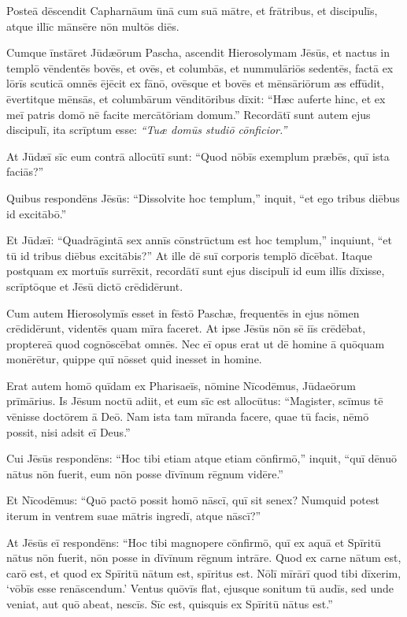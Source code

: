 \Versus Posteā dēscendit Capharnāum ūnā cum suā mātre, et frātribus, et discipulīs, atque illīc mānsēre nōn multōs diēs.

\Versus Cumque īnstāret Jūdæōrum Pascha, ascendit Hierosolymam Jēsūs,
\Versus et nactus in templō vēndentēs bovēs, et ovēs, et columbās, et nummulāriōs sedentēs,
\Versus factā ex lōrīs scuticā omnēs ējēcit ex fānō, ovēsque et bovēs et mēnsāriōrum æs effūdit, ēvertitque mēnsās,
\Versus et columbārum vēnditōribus dīxit: ``Hæc auferte hinc, et ex meī patris domō nē facite mercātōriam domum.''
\Versus Recordātī sunt autem ejus discipulī, ita scrīptum esse: \emph{``Tuæ domūs studiō cōnficior.''}

\Versus At Jūdæī sīc eum contrā allocūtī sunt: ``Quod nōbīs exemplum præbēs, quī ista faciās?''

\Versus Quibus respondēns Jēsūs: ``Dissolvite hoc templum,'' inquit, ``et ego tribus diēbus id excitābō.''

\Versus Et Jūdæī: ``Quadrāgintā sex annīs cōnstrūctum est hoc templum,'' inquiunt, ``et tū id tribus diēbus excitābis?''
\Versus At ille dē suī corporis templō dīcēbat.
\Versus Itaque postquam ex mortuīs surrēxit, recordātī sunt ejus discipulī id eum illīs dīxisse, scrīptōque et Jēsū dictō crēdidērunt.

\Versus Cum autem Hierosolymīs esset in fēstō Paschæ, frequentēs in ejus nōmen crēdidērunt, videntēs quam mīra faceret.
\Versus At ipse Jēsūs nōn sē iīs crēdēbat, proptereā quod cognōscēbat omnēs.
\Versus Nec eī opus erat ut dē homine ā quōquam monērētur, quippe quī nōsset quid inesset in homine.


\Caput
\Versus Erat autem homō quīdam ex Pharisaeīs, nōmine Nīcodēmus, Jūdaeōrum prīmārius.
\Versus Is Jēsum noctū adiit, et eum sīc est allocūtus: ``Magister, scīmus tē vēnisse doctōrem ā Deō. Nam ista tam mīranda facere, quae tū facis, nēmō possit, nisi adsit eī Deus.''

\Versus Cui Jēsūs respondēns: ``Hoc tibi etiam atque etiam cōnfirmō,'' inquit, ``quī dēnuō nātus nōn fuerit, eum nōn posse dīvīnum rēgnum vidēre.''

\Versus Et Nīcodēmus: ``Quō pactō possit homō nāscī, quī sit senex? Numquid potest iterum in ventrem suae mātris ingredī, atque nāscī?''

\Versus At Jēsūs eī respondēns: ``Hoc tibi magnopere cōnfirmō, quī ex aquā et Spīritū nātus nōn fuerit, nōn posse in dīvīnum rēgnum intrāre.
\Versus Quod ex carne nātum est, carō est, et quod ex Spīritū nātum est, spīritus est.
\Versus Nōlī mīrārī quod tibi dīxerim, `vōbīs esse renāscendum.'
\Versus Ventus quōvīs flat, ejusque sonitum tū audīs, sed unde veniat, aut quō abeat, nescīs. Sīc est, quisquis ex Spīritū nātus est.''

